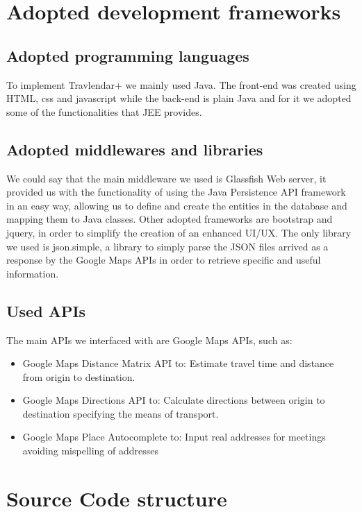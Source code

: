 \documentclass{article}
\begin{document}
\clearpage
\section{Adopted development frameworks}
\subsection{Adopted programming languages}

To implement Travlendar+ we mainly used Java. The front-end was created using HTML, css and javascript while the back-end is plain Java and for it we adopted some of the functionalities that JEE provides.


\subsection{Adopted middlewares and libraries}
We could say that the main middleware we used is Glassfish Web server, it provided us with the functionality of using the Java Persistence API framework in an easy way, allowing us to define and create the entities in the database and mapping them to Java classes.
Other adopted frameworks are bootstrap and jquery, in order to simplify the creation of an enhanced UI/UX.
The only library we used is json.simple, a library to simply parse the JSON files arrived as a response by the Google Maps APIs in order to retrieve specific and useful information.


\subsection{Used APIs}
The main APIs we interfaced with are Google Maps APIs, such as:
\begin{itemize}
\item Google Maps Distance Matrix API to:
Estimate travel time and distance from origin to destination.
\item Google Maps Directions API to:
Calculate directions between origin to destination specifying the means of transport.
\item Google Maps Place Autocomplete to: Input real addresses for meetings avoiding mispelling of addresses
\end{itemize}



\clearpage
\section{Source Code structure}

\end{document}
